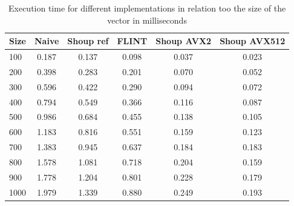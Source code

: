 \documentclass{article}
\begin{document}
\begin{table}[H]
    \centering
    \caption{Execution time for different implementations in relation too the size of the vector in milliseconds}
    \begin{tabular}{|l|c|c|c|c|c|}
        \hline
        Size & Naive & Shoup ref & FLINT & Shoup AVX2 & Shoup AVX512 \\ \hline
        100  & 0.187 & 0.137     & 0.098 & 0.037      & 0.023        \\
        200  & 0.398 & 0.283     & 0.201 & 0.070      & 0.052        \\
        300  & 0.596 & 0.422     & 0.290 & 0.094      & 0.072        \\
        400  & 0.794 & 0.549     & 0.366 & 0.116      & 0.087        \\
        500  & 0.986 & 0.684     & 0.455 & 0.138      & 0.105        \\
        600  & 1.183 & 0.816     & 0.551 & 0.159      & 0.123        \\
        700  & 1.383 & 0.945     & 0.637 & 0.184      & 0.183        \\
        800  & 1.578 & 1.081     & 0.718 & 0.204      & 0.159        \\
        900  & 1.778 & 1.204     & 0.801 & 0.228      & 0.179        \\
        1000 & 1.979 & 1.339     & 0.880 & 0.249      & 0.193        \\
        \hline
    \end{tabular}
\end{table}
\end{document}
